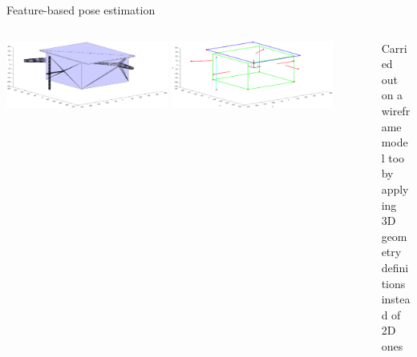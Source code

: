 \documentclass[10pt]{beamer}
\begin{document}
\begin{frame}{Feature-based pose estimation}
  \bigskip

  \begin{columns}[T,onlytextwidth]
    \begin{column}{0.6\textwidth}
      \vspace{0.38cm}
      \hspace{-0.3cm}
      \includegraphics[width=0.45\textwidth]{gfx/cadFull.eps}
      \hspace{0.1cm}
      \includegraphics[width=0.45\textwidth]{gfx/wireframeModel.eps}
    \end{column}
    \hspace{0.2cm}
    \begin{column}{0.45\textwidth}
      Carried out on a wireframe\\ model too by applying 3D\\ geometry definitions\\ instead of 2D ones
    \end{column}
  \end{columns}

\end{frame}
\end{document}
